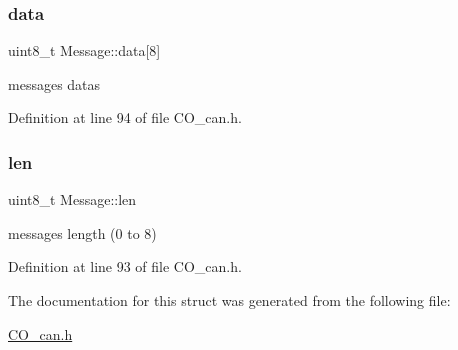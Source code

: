 \mbox{\label{struct_message_a605b149e9987071433ebb36b43353526}} 
\subsubsection{\texorpdfstring{data}{data}}
{\footnotesize\ttfamily uint8\+\_\+t Message\+::data\mbox{[}8\mbox{]}}

message\textquotesingle{}s datas 

Definition at line 94 of file C\+O\+\_\+can.\+h.

\mbox{\label{struct_message_a0e2f37b0ed471c18c4d1a71a23981c23}} 
\subsubsection{\texorpdfstring{len}{len}}
{\footnotesize\ttfamily uint8\+\_\+t Message\+::len}

message\textquotesingle{}s length (0 to 8) 

Definition at line 93 of file C\+O\+\_\+can.\+h.



The documentation for this struct was generated from the following file\+:\begin{DoxyCompactItemize}
\item 
\mbox{\hyperlink{_c_o__can_8h}{C\+O\+\_\+can.\+h}}\end{DoxyCompactItemize}
